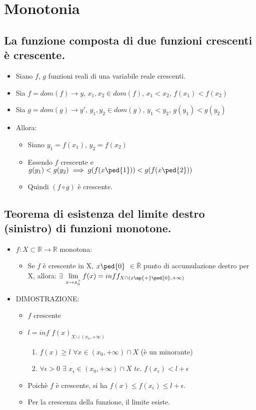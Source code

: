 \documentclass[10pt]{article}
\begin{document}
\section{Monotonia}
\subsection{La funzione composta di due funzioni crescenti è crescente.}
\begin{itemize}
\item
Siano $f$, $g$ funzioni reali di una variabile reale crescenti.
\item
Sia $f = dom(f) \rightarrow y$, $x_1, x_2 \in dom(f)$,  $x_1 < x_2$, $f(x_1) < f(x_2)$
\item
Sia $g = dom(g) \rightarrow y'$, $y_1, y_2 \in dom(g)$,  $y_1 < y_2$, $g(y_1) < g(y_2)$
\item Allora:
\begin{itemize}
\item
Siano $y_1 = f(x_1)$, $y_2=f(x_2)$
\item
Essendo $f$ crescente e $g(y_1) < g(y_2) \implies g(f(x\ped{1})) < g(f(x\ped{2}))$
\item
Quindi $(f \circ g)$ è crescente.
\end{itemize}
\end{itemize}
\medskip 
\subsection{Teorema di esistenza del limite destro (sinistro) di funzioni monotone.}

\begin{itemize}
\item
$f:X\subset \mathbb{R}  \rightarrow  \mathbb{R} $ monotona:
\begin{itemize}
\item
Se $f$ è crescente in X, $x\ped{0}$ $\in \bar{\mathbb{R} }$ punto di accumulazione destro per X, allora: 
\subitem $\exists$  $\displaystyle {\lim_{ x \to x_0^+} {f(x)}= inf f_{X\cap(x\ap{+}\ped{0}, +\infty)}}$
\end{itemize}\medskip
\item 
DIMOSTRAZIONE:
\begin{itemize}
\item
$f$ crescente
\item
$l = inf$ $f(x)_{X\cup(x_o, +\infty)}$
\begin{enumerate}
\item
$f(x) \geq l$ $\forall x \in (x_0, +\infty)\cap X$ (è un minorante)
\item
$\forall \displaystyle{\epsilon} > 0$ $\exists$ $x_\epsilon \in (x_0, +\infty)\cap X$ $tc.$ $\displaystyle {f(x_\epsilon)} < \displaystyle{l+\epsilon}$
\end{enumerate}\medskip
\item
Poichè $f$ è crescente, si ha $f(x) \leq f(x_\epsilon) \leq l+\epsilon$.
\item
Per la crescenza della funzione, il limite esiste.
\end{itemize}
\end{itemize}
\end{document}
